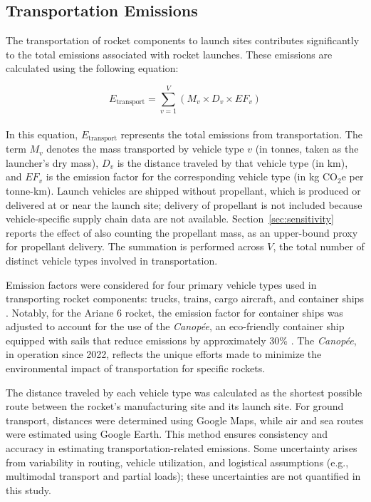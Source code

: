 \documentclass[pdflatex,sn-mathphys-num]{sn-jnl}
\theoremstyle{thmstyleone}%
\theoremstyle{thmstyletwo}%
\theoremstyle{thmstylethree}%
\begin{document}
\subsection{Transportation Emissions}

The transportation of rocket components to launch sites contributes significantly to the total emissions associated with rocket launches. These emissions are calculated using the following equation:

\begin{equation}
E_{\text{transport}} = \sum_{v=1}^{V} \left( M_{v} \times D_{v} \times EF_{v} \right)
\end{equation}
\\
In this equation, \( E_{\text{transport}} \) represents the total emissions from transportation. The term \( M_{v} \) denotes the mass transported by vehicle type \( v \) (in tonnes, taken as the launcher's dry mass), \( D_{v} \) is the distance traveled by that vehicle type (in km), and \( EF_{v} \) is the emission factor for the corresponding vehicle type (in kg CO$_2$e per tonne-km). Launch vehicles are shipped without propellant, which is produced or delivered at or near the launch site; delivery of propellant is not included because vehicle-specific supply chain data are not available. Section~\ref{sec:sensitivity} reports the effect of also counting the propellant mass, as an upper-bound proxy for propellant delivery. The summation is performed across \( V \), the total number of distinct vehicle types involved in transportation.

Emission factors were considered for four primary vehicle types used in transporting rocket components: trucks, trains, cargo aircraft, and container ships \citep{cbo_emissions_nodate}. Notably, for the Ariane 6 rocket, the emission factor for container ships was adjusted to account for the use of the \textit{Canopée}, an eco-friendly container ship equipped with sails that reduce emissions by approximately 30\% \citep{werner_orcelle_2023}. The \textit{Canopée}, in operation since 2022, reflects the unique efforts made to minimize the environmental impact of transportation for specific rockets.

The distance traveled by each vehicle type was calculated as the shortest possible route between the rocket’s manufacturing site and its launch site. For ground transport, distances were determined using Google Maps, while air and sea routes were estimated using Google Earth. This method ensures consistency and accuracy in estimating transportation-related emissions. Some uncertainty arises from variability in routing, vehicle utilization, and logistical assumptions (e.g., multimodal transport and partial loads); these uncertainties are not quantified in this study.
\end{document}
